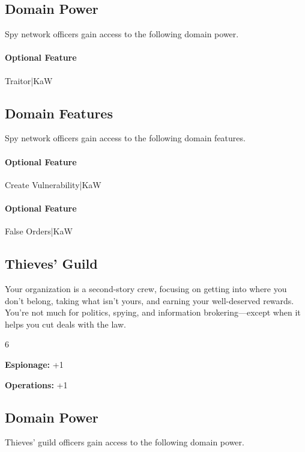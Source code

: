 \documentclass[10pt,a4paper,twoside,bg=print,twocolumn,openany,nodeprecatedcode]{dndbook}
\begin{document}
\subsection{Domain Power}
Spy network officers gain access to the following domain power.

\paragraph{Optional Feature}
Traitor|KaW

\subsection{Domain Features}
Spy network officers gain access to the following domain features.

\paragraph{Optional Feature}
Create Vulnerability|KaW

\paragraph{Optional Feature}
False Orders|KaW

\subsection{Thieves' Guild}
Your organization is a second-story crew, focusing on getting into where you don't belong, taking what isn't yours, and earning your well-deserved rewards. You're not much for politics, spying, and information brokering—except when it helps you cut deals with the law.

{\par \vspace { 9pt plus 3pt minus 3pt } \noindent  {} \nopagebreak }

\begin{itemize}
\begin{multicols}{6}
\item \textbf{Espionage:} +1
\item \textbf{Operations:} +1
\end{multicols}

\end{itemize}

\subsection{Domain Power}
Thieves' guild officers gain access to the following domain power.
\end{document}
